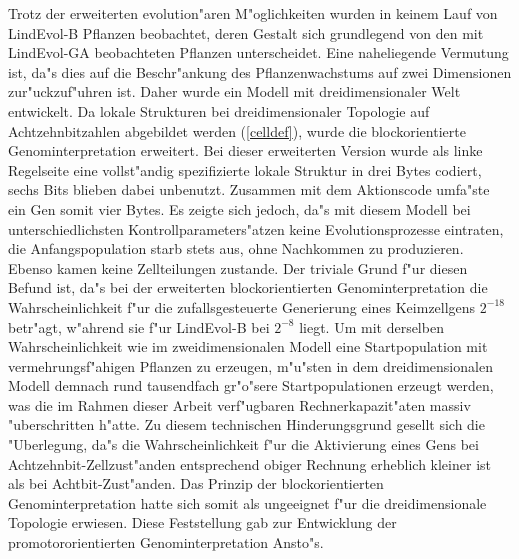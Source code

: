 \begin{sloppypar}
Trotz der erweiterten evolution"aren M"oglichkeiten wurden in keinem Lauf von LindEvol-B Pflanzen beobachtet,
deren Gestalt sich grundlegend von den mit LindEvol-GA beobachteten Pflanzen unterscheidet. Eine naheliegende
Vermutung ist, da"s dies auf die Beschr"ankung des Pflanzenwachstums auf zwei Dimensionen zur"uckzuf"uhren ist.
Daher wurde ein Modell mit dreidimensionaler Welt entwickelt. Da lokale Strukturen bei dreidimensionaler Topologie
auf Achtzehnbitzahlen abgebildet werden (\ref{celldef}), wurde die blockorientierte Genominterpretation
erweitert. Bei dieser erweiterten Version wurde als linke Regelseite eine vollst"andig spezifizierte lokale Struktur
in drei Bytes codiert, sechs Bits blieben dabei unbenutzt. Zusammen mit dem Aktionscode umfa"ste ein Gen somit
vier Bytes. Es zeigte sich jedoch, da"s mit diesem Modell bei unterschiedlichsten Kontrollparameters"atzen keine
Evolutionsprozesse eintraten, die Anfangspopulation starb stets aus, ohne Nachkommen zu produzieren. Ebenso kamen
keine Zellteilungen zustande. Der triviale Grund f"ur diesen Befund ist, da"s bei der erweiterten blockorientierten
Genominterpretation die Wahrscheinlichkeit f"ur die zufallsgesteuerte Generierung eines Keimzellgens $2^{-18}$
betr"agt, w"ahrend sie f"ur LindEvol-B bei $2^{-8}$ liegt. Um mit derselben Wahrscheinlichkeit wie im zweidimensionalen
Modell eine Startpopulation mit vermehrungsf"ahigen Pflanzen zu erzeugen, m"u"sten in dem dreidimensionalen Modell
demnach rund tausendfach gr"o"sere Startpopulationen erzeugt werden, was die im Rahmen dieser Arbeit verf"ugbaren Rechnerkapazit"aten
massiv "uberschritten h"atte. Zu diesem technischen Hinderungsgrund gesellt sich die "Uberlegung, da"s die Wahrscheinlichkeit
f"ur die Aktivierung eines Gens bei Achtzehnbit-Zellzust"anden entsprechend obiger Rechnung erheblich kleiner ist als
bei Achtbit-Zust"anden. Das Prinzip der blockorientierten Genominterpretation hatte sich somit als ungeeignet f"ur
die dreidimensionale Topologie erwiesen. Diese Feststellung gab zur Entwicklung der promotororientierten Genominterpretation
Ansto"s.
\end{sloppypar}


